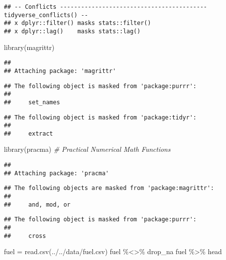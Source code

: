 \documentclass[
]{article}
\newenvironment{Shaded}{\begin{snugshade}}{\end{snugshade}}
\newcommand{\CommentTok}[1]{\textcolor[rgb]{0.56,0.35,0.01}{\textit{#1}}}
\newcommand{\FunctionTok}[1]{\textcolor[rgb]{0.00,0.00,0.00}{#1}}
\newcommand{\NormalTok}[1]{#1}
\newcommand{\OtherTok}[1]{\textcolor[rgb]{0.56,0.35,0.01}{#1}}
\newcommand{\SpecialCharTok}[1]{\textcolor[rgb]{0.00,0.00,0.00}{#1}}
\newcommand{\StringTok}[1]{\textcolor[rgb]{0.31,0.60,0.02}{#1}}
\begin{document}
\begin{verbatim}
## -- Conflicts ------------------------------------------ tidyverse_conflicts() --
## x dplyr::filter() masks stats::filter()
## x dplyr::lag()    masks stats::lag()
\end{verbatim}

\begin{Shaded}
\begin{Highlighting}[]
\FunctionTok{library}\NormalTok{(magrittr)}
\end{Highlighting}
\end{Shaded}

\begin{verbatim}
## 
## Attaching package: 'magrittr'
\end{verbatim}

\begin{verbatim}
## The following object is masked from 'package:purrr':
## 
##     set_names
\end{verbatim}

\begin{verbatim}
## The following object is masked from 'package:tidyr':
## 
##     extract
\end{verbatim}

\begin{Shaded}
\begin{Highlighting}[]
\FunctionTok{library}\NormalTok{(pracma) }\CommentTok{\# Practical Numerical Math Functions}
\end{Highlighting}
\end{Shaded}

\begin{verbatim}
## 
## Attaching package: 'pracma'
\end{verbatim}

\begin{verbatim}
## The following objects are masked from 'package:magrittr':
## 
##     and, mod, or
\end{verbatim}

\begin{verbatim}
## The following object is masked from 'package:purrr':
## 
##     cross
\end{verbatim}

\begin{Shaded}
\begin{Highlighting}[]
\NormalTok{fuel }\OtherTok{=} \FunctionTok{read.csv}\NormalTok{(}\StringTok{\textquotesingle{}../../data/fuel.csv\textquotesingle{}}\NormalTok{)}
\NormalTok{fuel }\SpecialCharTok{\%\textless{}\textgreater{}\%}\NormalTok{ drop\_na}
\NormalTok{fuel }\SpecialCharTok{\%\textgreater{}\%}\NormalTok{ head}
\end{Highlighting}
\end{Shaded}
\end{document}
